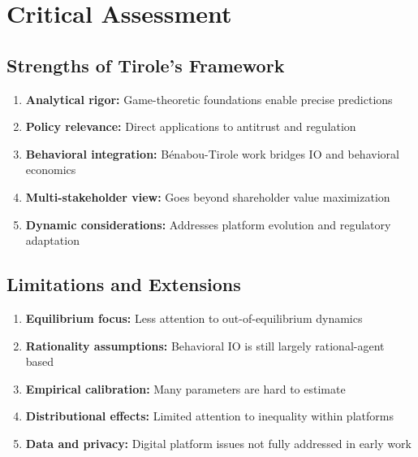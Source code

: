 \section{Critical Assessment}
\label{sec:jt-critical}

\subsection{Strengths of Tirole's Framework}

\begin{enumerate}
    \item \textbf{Analytical rigor:} Game-theoretic foundations enable precise predictions
    \item \textbf{Policy relevance:} Direct applications to antitrust and regulation
    \item \textbf{Behavioral integration:} Bénabou-Tirole work bridges IO and behavioral economics
    \item \textbf{Multi-stakeholder view:} Goes beyond shareholder value maximization
    \item \textbf{Dynamic considerations:} Addresses platform evolution and regulatory adaptation
\end{enumerate}

\subsection{Limitations and Extensions}

\begin{enumerate}
    \item \textbf{Equilibrium focus:} Less attention to out-of-equilibrium dynamics
    \item \textbf{Rationality assumptions:} Behavioral IO is still largely rational-agent based
    \item \textbf{Empirical calibration:} Many parameters are hard to estimate
    \item \textbf{Distributional effects:} Limited attention to inequality within platforms
    \item \textbf{Data and privacy:} Digital platform issues not fully addressed in early work
\end{enumerate}

